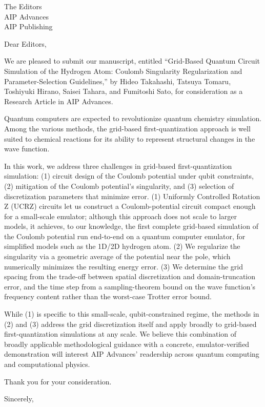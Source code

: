 \documentclass[11pt]{letter}
\begin{document}
\begin{letter}{The Editors \\ AIP Advances \\ AIP Publishing}

\opening{Dear Editors,}

We are pleased to submit our manuscript, entitled ``Grid-Based Quantum Circuit
Simulation of the Hydrogen Atom: Coulomb Singularity Regularization and
Parameter-Selection Guidelines,'' by Hideo Takahashi, Tatsuya Tomaru,
Toshiyuki Hirano, Saisei Tahara, and Fumitoshi Sato, for consideration as a
Research Article in AIP Advances.

Quantum computers are expected to revolutionize quantum chemistry simulation.
Among the various methods, the grid-based first-quantization approach is
well suited to chemical reactions for its ability to represent structural
changes in the wave function.

In this work, we address three challenges in grid-based first-quantization
simulation: (1) circuit design of the Coulomb potential under qubit constraints, (2)
mitigation of the Coulomb potential's singularity, and (3) selection of
discretization parameters that minimize error. (1) Uniformly Controlled
Rotation Z (UCRZ) circuits let us construct a Coulomb-potential circuit
compact enough for a small-scale emulator; although this approach does not
scale to larger models, it achieves, to our knowledge, the first complete
grid-based simulation of the Coulomb potential run end-to-end on a quantum
computer emulator, for simplified models such as the 1D/2D hydrogen atom.
(2) We regularize
the singularity via a geometric average of the potential near the pole, which
numerically minimizes the resulting energy error. (3) We determine the grid
spacing from the trade-off between spatial discretization and domain-truncation
error, and the time step from a sampling-theorem bound on the wave function's
frequency content rather than the worst-case Trotter error bound.

While (1) is specific to this small-scale, qubit-constrained regime, the
methods in (2) and (3) address the grid discretization itself and apply
broadly to grid-based first-quantization simulations at any scale. We
believe this combination of broadly applicable methodological guidance with
a concrete, emulator-verified demonstration will interest AIP Advances'
readership across quantum computing and computational physics.

Thank you for your consideration.

\closing{Sincerely,}

\end{letter}
\end{document}
